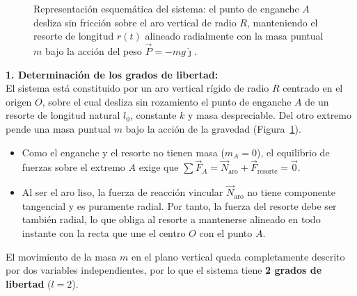 \documentclass[11pt,a4paper]{article}
\begin{document}
\begin{figure}[H]
\vspace{-0.5em}
\caption{Representación esquemática del sistema: el punto de enganche $A$ desliza sin fricción sobre el aro vertical de radio $R$, manteniendo el resorte de longitud $r(t)$ alineado radialmente con la masa puntual $m$ bajo la acción del peso $\vec{P} = -mg\hat{\jmath}$.}
\label{fig:diagrama_aro_resorte}
\end{figure}

\textbf{1. Determinación de los grados de libertad:}\\
El sistema está constituido por un aro vertical rígido de radio $R$ centrado en el origen $O$, sobre el cual desliza sin rozamiento el punto de enganche $A$ de un resorte de longitud natural $l_0$, constante $k$ y masa despreciable. Del otro extremo pende una masa puntual $m$ bajo la acción de la gravedad (Figura~\ref{fig:diagrama_aro_resorte}).
\begin{itemize}
    \item Como el enganche y el resorte no tienen masa ($m_A = 0$), el equilibrio de fuerzas sobre el extremo $A$ exige que $\sum \vec{F}_A = \vec{N}_{\text{aro}} + \vec{F}_{\text{resorte}} = \vec{0}$.
    \item Al ser el aro liso, la fuerza de reacción vincular $\vec{N}_{\text{aro}}$ no tiene componente tangencial y es puramente radial. Por tanto, la fuerza del resorte debe ser también radial, lo que obliga al resorte a mantenerse alineado en todo instante con la recta que une el centro $O$ con el punto $A$.
\end{itemize}
El movimiento de la masa $m$ en el plano vertical queda completamente descrito por dos variables independientes, por lo que el sistema tiene \textbf{2 grados de libertad} ($l = 2$).
\end{document}
